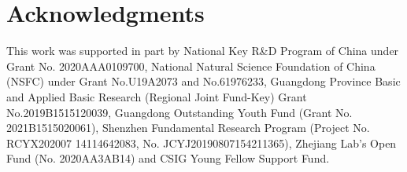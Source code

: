 \documentclass[sigconf]{acmart}
\begin{document}
\section{Acknowledgments}
This work was supported in part by National Key R\&D Program of China under Grant No. 2020AAA0109700, National Natural Science Foundation of China (NSFC) under Grant No.U19A2073 and No.61976233, Guangdong Province Basic and Applied Basic Research (Regional Joint Fund-Key) Grant No.2019B1515120039, Guangdong Outstanding Youth Fund (Grant No. 2021B1515020061), Shenzhen Fundamental Research Program (Project No. RCYX202007 14114642083, No. JCYJ20190807154211365), Zhejiang Lab’s Open Fund (No. 2020AA3AB14) and CSIG Young Fellow Support Fund.

\clearpage



\end{document}
